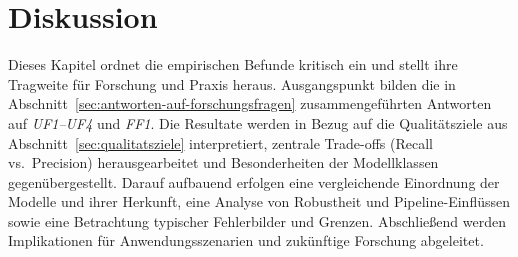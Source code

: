 \chapter{Diskussion}\label{ch:diskussion}

Dieses Kapitel ordnet die empirischen Befunde kritisch ein und stellt ihre Tragweite für Forschung und Praxis heraus. Ausgangspunkt bilden die in Abschnitt~\ref{sec:antworten-auf-forschungsfragen} zusammengeführten Antworten auf \emph{UF1–UF4} und \emph{FF1}. Die Resultate werden in Bezug auf die Qualitätsziele aus Abschnitt~\ref{sec:qualitatsziele} interpretiert, zentrale Trade-offs (Recall vs.\ Precision) herausgearbeitet und Besonderheiten der Modellklassen gegenübergestellt. Darauf aufbauend erfolgen eine vergleichende Einordnung der Modelle und ihrer Herkunft, eine Analyse von Robustheit und Pipeline-Einflüssen sowie eine Betrachtung typischer Fehlerbilder und Grenzen. Abschließend werden Implikationen für Anwendungsszenarien und zukünftige Forschung abgeleitet.










